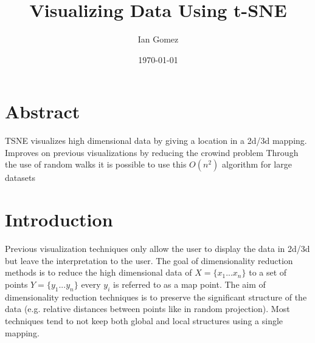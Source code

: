 \documentclass[11pt]{article}
\author{Ian Gomez}
\date{\today}
\title{Visualizing Data Using t-SNE}
\begin{document}
\maketitle
\tableofcontents


\section{Abstract}
\label{sec:org2a89c32}
TSNE visualizes high dimensional data by giving a location in a 2d/3d mapping.
Improves on previous visualizations by reducing the crowind problem
Through the use of random walks it is possible to use this \(O(n^2)\) algorithm for large datasets
\section{Introduction}
\label{sec:org80e8b44}
Previous visualization techniques only allow the user to display the data in 2d/3d but leave the interpretation to the user.
The goal of dimensionality reduction methods is to reduce the high dimensional data of \(X = \{x_1...x_n\}\) to a set of points \(Y = \{y_1...y_n\}\)
every \(y_i\) is referred to as a map point. The aim of dimensionality reduction techniques is to preserve the significant structure of the data (e.g. relative distances between points like in random projection).
Most techniques tend to not keep both global and local structures using a single mapping.
\end{document}
